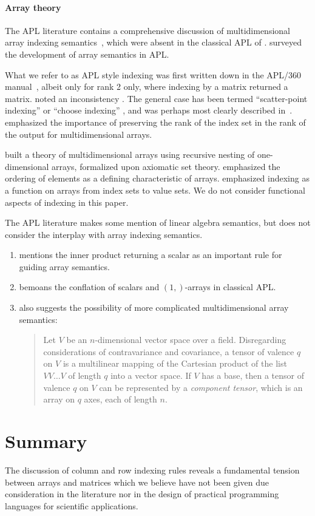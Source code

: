 \paragraph{Array theory} The APL literature contains a comprehensive discussion
of multidimensional array indexing semantics~\cite{Brown1982}, which were
absent in the classical APL of \cite{Iverson1962}. \cite{Ruehr1982,Gerth1988}
surveyed the development of array semantics in APL.

What we refer to as APL style indexing was first written down in the APL/360
manual~\cite{Falkoff1968}, albeit only for rank 2 only, where indexing by a
matrix returned a matrix. \cite{Haegi1976} noted an inconsistency . The general
case has been termed ``scatter-point indexing'' or ``choose indexing''
\cite{Brown1972,Ruehr1982}, and was perhaps most clearly described
in~\cite{More1979}. \cite{Gull1979} emphasized the importance of preserving
the rank of the index set in the rank of the output for multidimensional
arrays.

\cite{More1973} built a theory of multidimensional arrays using recursive
nesting of one-dimensional arrays, formalized upon axiomatic set theory.
\cite{Ghandour1973} emphasized the ordering of elements as a defining
characteristic of arrays. \cite{Gerth1988} emphasized indexing as a function on
arrays from index sets to value sets. We do not consider functional aspects of
indexing in this paper.

The APL literature makes some mention of linear algebra semantics, but does not
consider the interplay with array indexing semantics.

\begin{enumerate}
\item \cite{More1973} mentions the inner product returning a scalar as an
	important rule for guiding array semantics.

\item \cite{Haegi1976} bemoans the conflation of scalars and $(1,)$-arrays in
	classical APL.

\item \cite[p. 153]{More1973} also suggests the possibility of more complicated
	multidimensional array semantics:

\begin{quote}
Let $V$ be an $n$-dimensional vector space over a field. Disregarding
considerations of contravariance and covariance, a tensor of valence $q$ on $V$
is a multilinear mapping of the Cartesian product of the list $V V \dots V$ of
length $q$ into a vector space. If $V$ has a base, then a tensor of valence $q$
on $V$ can be represented by a \textit{component tensor}, which is an array on
$q$ axes, each of length $n$.
\end{quote}

\end{enumerate}

\section{Summary}

The discussion of column and row indexing rules reveals a fundamental tension
between arrays and matrices which we believe have not been given due
consideration in the literature nor in the design of practical programming
languages for scientific applications.

